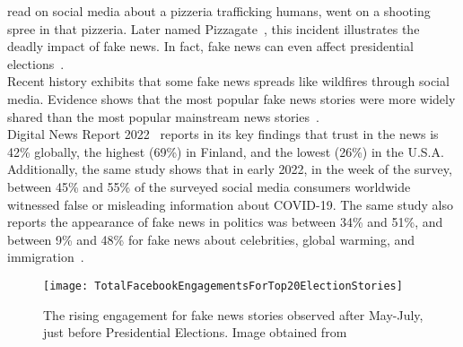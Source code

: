 read on social media about a pizzeria trafficking humans, went on a shooting spree in that pizzeria. Later named
Pizzagate~\parencite{Pizzagate_Fisher}, this incident illustrates the deadly impact of fake news. In fact, fake news can even affect presidential elections~\parencite{SocialMediaAndFakeNewsIn2016Election_Allcott, TrumpWonBecauseOfFacebook_Read}.\\
Recent history exhibits that some fake news spreads like wildfires through social media. Evidence shows that the most popular fake news stories
were more widely shared than the most popular mainstream news stories~\parencite{Buzzfeed_FakeNewsOutperformRealNews_Silverman}.\\
Digital News Report 2022~\parencite{ReutersInstituteDigitalNewsReport} reports in its key findings that trust in the news is 42\% globally,
the highest (69\%) in Finland, and the lowest (26\%) in the U.S.A. Additionally, the same study shows that in early 2022, in the week of the
survey, between 45\% and 55\% of the surveyed social media consumers worldwide witnessed false or misleading information about COVID-19. The
same study also reports the appearance of fake news in politics was between 34\% and 51\%, and between 9\% and 48\% for fake news about
celebrities, global warming, and immigration~\parencite{StatistaUsageOfSocialMedia_Watson}.
\begin{figure}
    \centering
    \texttt{[image: TotalFacebookEngagementsForTop20ElectionStories]}
    \caption[Total Facebook Engagements for Top 20 Election Stories]{The rising engagement for fake news stories observed after May-July, just before Presidential Elections. Image obtained from~\parencite{Buzzfeed_FakeNewsOutperformRealNews_Silverman}}\label{fig:TotalFacebookEngagementsForTop20ElectionStories}
\end{figure}
